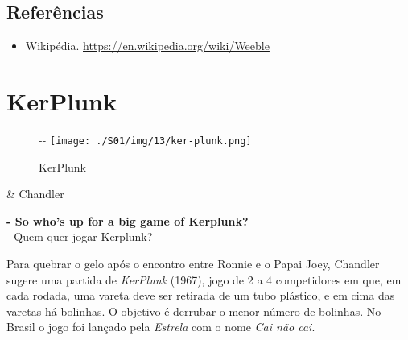 \hypertarget{referuxeancias}{%
\subsection{Referências}\label{referuxeancias}}

\begin{itemize}
\tightlist
\item
  \sloppy Wikipédia. \url{https://en.wikipedia.org/wiki/Weeble}
\end{itemize}

\hypertarget{kerplunk}{%
\section{KerPlunk}\label{kerplunk}}

\begin{figure}[!ht]
  \begin{adjustwidth}{-\oddsidemargin-1in}{-\rightmargin}
    \centering
    \texttt{[image: ./S01/img/13/ker-plunk.png]}
    \caption{KerPlunk\label{fig:ker-plunk}}
  \end{adjustwidth}
\end{figure}

\begin{tcolorbox}[enhanced,center upper,
    drop fuzzy shadow southeast, boxrule=0.3pt,
    lower separated=false,
    colframe=black!30!dialogoBorder,colback=white]
\begin{minipage}[c]{0.16\linewidth}
   & \centering \scriptsize{Chandler}
\end{minipage}
\hfill
\begin{minipage}[c]{0.8\linewidth}
  \textbf{- So who's up for a big game of Kerplunk?}\\
  - Quem quer jogar Kerplunk?
\end{minipage}
\end{tcolorbox}

Para quebrar o gelo após o encontro entre Ronnie e o Papai Joey,
Chandler sugere uma partida de \emph{KerPlunk} (1967), jogo de 2 a 4
competidores em que, em cada rodada, uma vareta deve ser retirada de um
tubo plástico, e em cima das varetas há bolinhas. O objetivo é derrubar
o menor número de bolinhas. No Brasil o jogo foi lançado pela
\emph{Estrela} com o nome \emph{Cai não cai}.

